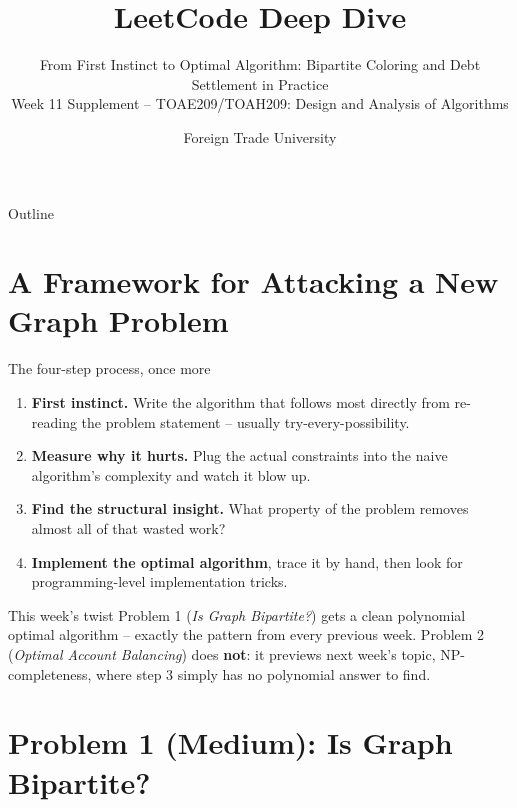 \documentclass[11pt,aspectratio=169]{beamer}
\title{LeetCode Deep Dive}
\subtitle{From First Instinct to Optimal Algorithm: Bipartite Coloring and Debt
Settlement in Practice\\
\small Week 11 Supplement -- TOAE209/TOAH209: Design and Analysis of Algorithms}
\author{Foreign Trade University}
\date{}
\begin{document}
\begin{frame}
  \titlepage
\end{frame}

\begin{frame}{Outline}
  \tableofcontents
\end{frame}

\section{A Framework for Attacking a New Graph Problem}

\begin{frame}{The four-step process, once more}
  \begin{enumerate}
    \item \textbf{First instinct.} Write the algorithm that follows most directly
    from re-reading the problem statement -- usually try-every-possibility.
    \item \textbf{Measure why it hurts.} Plug the actual constraints into the naive
    algorithm's complexity and watch it blow up.
    \item \textbf{Find the structural insight.} What property of the problem removes
    almost all of that wasted work?
    \item \textbf{Implement the optimal algorithm}, trace it by hand, then look for
    programming-level implementation tricks.
  \end{enumerate}
  \begin{alertblock}{This week's twist}
    Problem 1 (\emph{Is Graph Bipartite?}) gets a clean polynomial optimal algorithm --
    exactly the pattern from every previous week. Problem 2 (\emph{Optimal Account
    Balancing}) does \textbf{not}: it previews next week's topic, NP-completeness,
    where step 3 simply has no polynomial answer to find.
  \end{alertblock}
\end{frame}

\section{Problem 1 (Medium): Is Graph Bipartite?}
\end{document}
